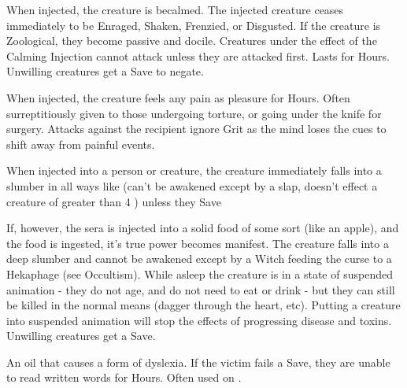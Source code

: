 {  \CHYMISTRY[
    Name=Al-Farabi's Calming Injection,
    Link=chymistry-al-farabis-calming-injection,
    Cost=500\AU,
    Duration=0 ,
    Toxin=Yes,
    Narcotic=No 
  ]

  When injected, the creature is becalmed. The injected creature ceases immediately to be Enraged, Shaken, Frenzied, or Disgusted.  If the creature is Zoological, they become passive and docile.  Creatures under the effect of the Calming Injection cannot attack unless they are attacked first.  Lasts for Hours. Unwilling creatures get a Save to negate.

  \CHYMISTRY[
    Name=Davy's Soothing Anesthetic,
    Link=chymistry-davys-soothing-anesthetic,
    Cost=500\AG,
    Duration=0 ,
    Toxin=Yes,
    Narcotic=No 
  ]

  When injected, the creature feels any pain as pleasure for Hours.  Often surreptitiously given to those undergoing torture, or going under the knife for surgery.  Attacks against the recipient ignore Grit as the mind loses the cues to shift away from painful events.  


  \CHYMISTRY[
    Name=Grimm's Stupurous Preparation,
    Link=chymistry-grimms-stupurous-preparation,
    Cost=500\AU,
    Duration=0 ,
    Toxin=Yes,
    Narcotic=No 
  ]


  When injected into a person or creature, the creature immediately falls into a slumber in all ways like  (can't be awakened except by a slap, doesn't effect a creature of greater than 4 \HD) unless they Save

  If, however, the sera is injected into a solid food of some sort (like an apple), and the food is ingested, it's true power becomes manifest.  The creature falls into a deep slumber and cannot be awakened except by a Witch feeding the curse to a Hekaphage (see Occultism). While asleep the creature is in a state of suspended animation - they do not age, and do not need to eat or drink - but they can still be killed in the normal means (dagger through the heart, etc).  Putting a creature into suspended animation will stop the effects of progressing disease and toxins.  Unwilling creatures get a Save. 

  \CHYMISTRY[
    Name=Wordwarp,
    Link=chymistry-wordwarp,
    Cost=500\AU,
    Duration=0 ,
    Toxin=Yes,
    Narcotic=No 
  ]

  An oil that causes a form of dyslexia.  If the victim fails a Save, they are unable to read written words for Hours.  Often used on .




}
